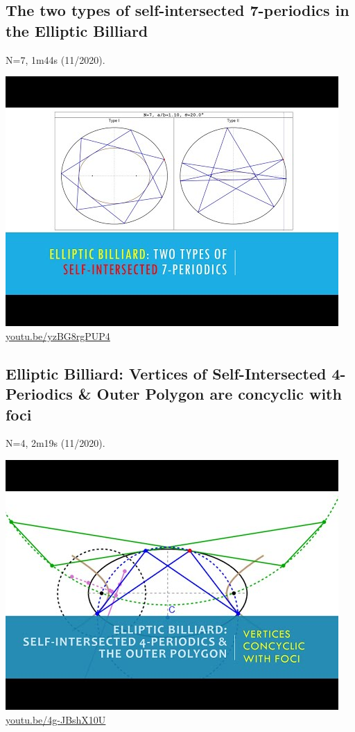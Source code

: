 \documentclass[12pt]{amsart}
\begin{document}
\subsection{The two types of self-intersected 7-periodics in the Elliptic Billiard}
\label{vid:yzBG8rgPUP4}
\noindent N=7, 1m44s (11/2020). 
\begin{center}\includegraphics[width=.5\textwidth]{pics/yzBG8rgPUP4.jpg} \\ 
\href{https://youtu.be/yzBG8rgPUP4}{\url{youtu.be/yzBG8rgPUP4}}\end{center}
% 
\subsection{Elliptic Billiard: Vertices of Self-Intersected 4-Periodics \& Outer Polygon are concyclic with foci}
\label{vid:4g-JBshX10U}
\noindent N=4, 2m19s (11/2020). 
\begin{center}\includegraphics[width=.5\textwidth]{pics/4g-JBshX10U.jpg} \\ 
\href{https://youtu.be/4g-JBshX10U}{\url{youtu.be/4g-JBshX10U}}\end{center}
% 
\end{document}
